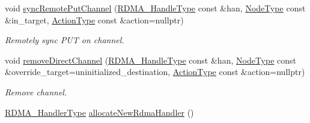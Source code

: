 \begin{DoxyCompactItemize}
void \hyperlink{structvt_1_1rdma_1_1_r_d_m_a_manager_aae382995709cd7827f256f9d5f3e45e4}{sync\+Remote\+Put\+Channel} (\hyperlink{namespacevt_a10442579ec4e7ebef223818e64bcf908}{R\+D\+M\+A\+\_\+\+Handle\+Type} const \&han, \hyperlink{namespacevt_a866da9d0efc19c0a1ce79e9e492f47e2}{Node\+Type} const \&in\+\_\+target, \hyperlink{namespacevt_ae0a5a7b18cc99d7b732cb4d44f46b0f3}{Action\+Type} const \&action=nullptr)
\begin{DoxyCompactList}\small\item\em Remotely sync P\+UT on channel. \end{DoxyCompactList}\item 
void \hyperlink{structvt_1_1rdma_1_1_r_d_m_a_manager_a9767f9beafd9a352ae2b9f0a189f7346}{remove\+Direct\+Channel} (\hyperlink{namespacevt_a10442579ec4e7ebef223818e64bcf908}{R\+D\+M\+A\+\_\+\+Handle\+Type} const \&han, \hyperlink{namespacevt_a866da9d0efc19c0a1ce79e9e492f47e2}{Node\+Type} const \&override\+\_\+target=uninitialized\+\_\+destination, \hyperlink{namespacevt_ae0a5a7b18cc99d7b732cb4d44f46b0f3}{Action\+Type} const \&action=nullptr)
\begin{DoxyCompactList}\small\item\em Remove channel. \end{DoxyCompactList}\item 
\hyperlink{namespacevt_a9530efb893c0f3846e8ac5f0507e0f49}{R\+D\+M\+A\+\_\+\+Handler\+Type} \hyperlink{structvt_1_1rdma_1_1_r_d_m_a_manager_a9b393c6dbd360c0b7bfb899e3fc0451b}{allocate\+New\+Rdma\+Handler} ()
\end{DoxyCompactItemize}
